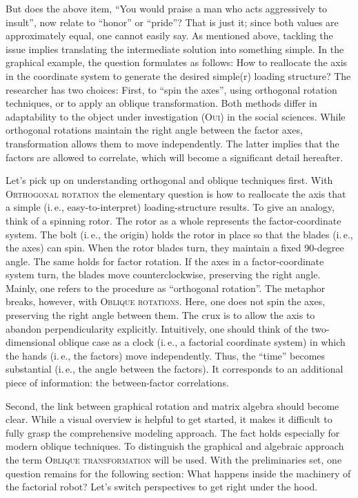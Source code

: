 \documentclass[jou, 11pt]{apa7}
\begin{document}
But does the above item, \enquote{You would praise a man who acts aggressively
to insult}, now relate to \enquote{honor} or \enquote{pride}? That is just it;
since both values are approximately equal, one cannot easily say. As mentioned
above, tackling the issue implies translating the intermediate solution into
something simple. In the graphical example, the question formulates as follows:
How to reallocate the axis in the coordinate system to generate the desired
simple(r) loading structure? The researcher has two choices: First, to
\enquote{spin the axes}, using orthogonal rotation techniques, or to apply an
oblique transformation. Both methods differ in adaptability to the object under
investigation (\textsc{Oui}) in the social sciences. While orthogonal rotations maintain
the right angle between the factor axes, transformation allows them to move
independently. The latter implies that the factors are allowed to correlate,
which will become a significant detail hereafter.

Let's pick up on understanding orthogonal and oblique techniques first. With
\textsc{Orthogonal rotation} the elementary question is how to reallocate the
axis that a simple (i.\,e., easy-to-interpret) loading-structure results. To
give an analogy, think of a spinning rotor. The rotor as a whole represents the
factor-coordinate system. The bolt (i.\,e., the origin) holds the rotor in place
so that the blades (i.\,e., the axes) can spin. When the rotor blades turn, they
maintain a fixed 90-degree angle. The same holds for factor rotation. If the
axes in a factor-coordinate system turn, the blades move counterclockwise,
preserving the right angle. Mainly, one refers to the procedure as
\enquote{orthogonal rotation}. The metaphor breaks, however, with \textsc{Oblique
rotations}. Here, one does not spin the axes, preserving the right angle between
them. The crux is to allow the axis to abandon perpendicularity explicitly.
Intuitively, one should think of the two-dimensional oblique case as a clock
(i.\,e., a factorial coordinate system) in which the hands (i.\,e., the factors)
move independently. Thus, the “time” becomes substantial (i.\,e., the angle
between the factors). It corresponds to an additional piece of information: the
between-factor correlations.

Second, the link between graphical rotation and matrix algebra should become
clear. While a visual overview is helpful to get started, it makes it difficult
to fully grasp the comprehensive modeling approach. The fact holds especially
for modern oblique techniques. To distinguish the graphical and algebraic
approach the term \textsc{Oblique transformation} \parencite{Revelle2021} will
be used. With the preliminaries set, one question remains for the following
section: What happens inside the machinery of the factorial robot? Let’s switch
perspectives to get right under the hood.
\end{document}
